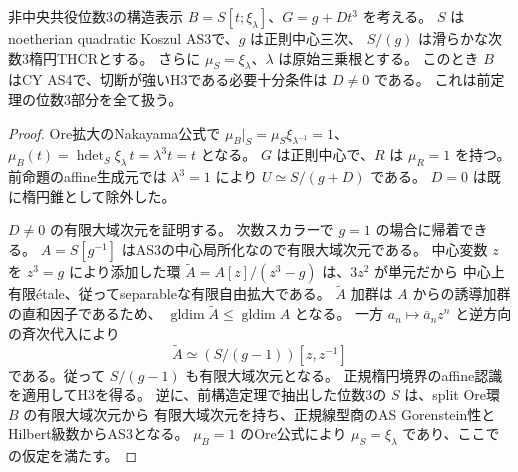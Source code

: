 \begin{theorem}[位数3の正規非中央楕円境界の全admissibility]
\label{thm:normal-order3-admissibility}
非中央共役位数3の構造表示
$B=S[t;\xi_\lambda]$、$G=g+Dt^3$ を考える。
$S$ はnoetherian quadratic Koszul AS3で、$g$ は正則中心三次、
$S/(g)$ は滑らかな次数3楕円THCRとする。
さらに $\mu_S=\xi_\lambda$、$\lambda$ は原始三乗根とする。
このとき $B$ はCY AS4で、切断が強いH3である必要十分条件は $D\ne0$ である。
これは前定理の位数3部分を全て扱う。
\end{theorem}
\begin{proof}
Ore拡大のNakayama公式で
$\mu_B|_S=\mu_S\xi_{\lambda^{-1}}=1$、
$\mu_B(t)=\operatorname{hdet}_S\xi_\lambda\,t=\lambda^3t=t$ となる。
$G$ は正則中心で、$R$ は $\mu_R=1$ を持つ。
前命題のaffine生成元では $\lambda^3=1$ により
$U\simeq S/(g+D)$ である。
$D=0$ は既に楕円錐として除外した。

$D\ne0$ の有限大域次元を証明する。
次数スカラーで $g=1$ の場合に帰着できる。
$A=S[g^{-1}]$ はAS3の中心局所化なので有限大域次元である。
中心変数 $z$ を $z^3=g$ により添加した環
$\widetilde A=A[z]/(z^3-g)$ は、$3z^2$ が単元だから
中心上有限\'{e}tale、従ってseparableな有限自由拡大である。
$\widetilde A$ 加群は $A$ からの誘導加群の直和因子であるため、
$\operatorname{gldim}\widetilde A\le\operatorname{gldim}A$ となる。
一方 $a_n\mapsto\overline a_n z^n$ と逆方向の斉次代入により
\[
 \widetilde A\simeq(S/(g-1))[z,z^{-1}]
\]
である。従って $S/(g-1)$ も有限大域次元となる。
正規楕円境界のaffine認識を適用してH3を得る。
逆に、前構造定理で抽出した位数3の $S$ は、split Ore環 $B$ の有限大域次元から
有限大域次元を持ち、正規線型商のAS Gorenstein性とHilbert級数からAS3となる。
$\mu_B=1$ のOre公式により $\mu_S=\xi_\lambda$ であり、ここでの仮定を満たす。
\end{proof}
